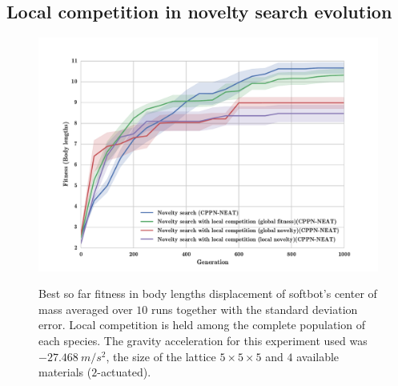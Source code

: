 \clearpage
\subsection{Local competition in novelty search evolution}

\begin{figure}[h!]
{\centering
\includegraphics[width=1.0\textwidth]{Figures/Results/NoveltyCompetitionsSize5.pdf}}
\caption{Best so far fitness in body lengths displacement of softbot's center of mass averaged over $10$ runs together with the standard deviation error. Local competition is held among the complete population of each species. The gravity acceleration for this experiment used was $-27.468\   m/s^2$, the size of the lattice $5\times 5\times5$ and $4$ available materials ($2$-actuated).}
\label{fig:NoveltyCompetitionsSize5}
\end{figure}